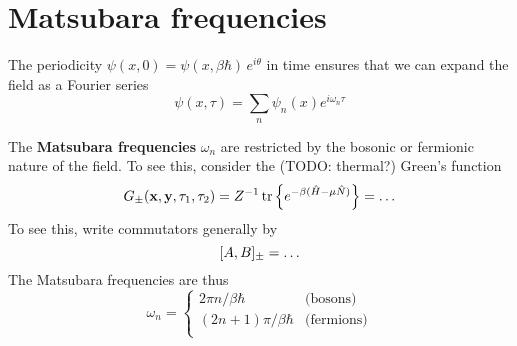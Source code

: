 \iffalse
The partition function is therefore
\begin{equation}
\begin{split}
	Z &= \int \dif \psi_0^\dagger \int \dif \psi_0 \, e^{-\psi_{n+1}^\dagger \psi_{n+1}} \braket{-\psi_0 | e^{-\beta(\hat{H} - \mu \hat{N})} | \psi_0} \\
	  &= \prod_n \int \dif \psi_n^\dagger \int \dif \psi_n \, e^{-\psi_{n+1}^\dagger \psi_{n+1}} \braket{\psi_{n+1} | e^{-(\hat{H} - \mu \hat{N}) \Delta \tau / \hbar} | \psi_n} \\
	  &= \prod_n \int \dif \psi_n^\dagger \int \dif \psi_n \, e^{-\psi_{n+1}^\dagger \psi_{n+1}} \braket{\psi_{n+1} | \psi_n} e^{-(H_n - \mu N) \Delta \tau / \hbar} \\
	  &= \prod_n \int \dif \psi_n^\dagger \int \dif \psi_n \, \exp \left\{ -\frac{\Delta t}{\hbar} \sum_n \int \dif^3 x \left( \psi^\dagger_{n+1} \frac{\psi_{n+1} - \psi_n}{\Delta t} + \ham - \mu \numdensity \right) \right\} \\
	  &= \oint_- \pathintdif \psi^\dagger \oint_- \pathintdif \psi \exp \left\{ \frac{1}{\hbar} \int_0^{\beta \hbar} \dif \tau \int \dif^3 x \left( -\psi^\dagger(\vec{x},\tau) \dot{\psi}(\vec{x},\tau) - \ham \left( \psi^\dagger(\vec{x},\tau), \psi(\vec{x},\tau) \right) + \mu \numdensity \right) \right\} \\
\end{split}
\end{equation}
\fi

\section{Matsubara frequencies}

The periodicity $\psi(x, 0) = \psi(x, \beta \hbar) \, e^{i \theta}$ in time ensures that we can expand the field as a Fourier series
\begin{equation}
	\psi(x, \tau) = \sum_n \psi_n(x) e^{i \omega_n \tau}
\end{equation}

The \textbf{Matsubara frequencies} $\omega_n$ are restricted by the bosonic or fermionic nature of the field.
To see this, consider the (TODO: thermal?) Green's function
\begin{equation}
	G_\pm (\mathbf{x}, \mathbf{y}, \tau_1, \tau_2) = Z^{-1} \, \text{tr} \left\{ e^{-\beta (\hat{H} - \mu \hat{N})} \right\} = \ldots
\end{equation}
To see this, write commutators generally by
\begin{equation}
	[ A , B ]_\pm = \ldots
\end{equation}
The Matsubara frequencies are thus
\begin{equation}
	\omega_n = \begin{cases}
			       2 \pi n / \beta \hbar    & \text{(bosons)} \\
				   (2n+1) \pi / \beta \hbar & \text{(fermions)} \\
	           \end{cases}
\end{equation}

